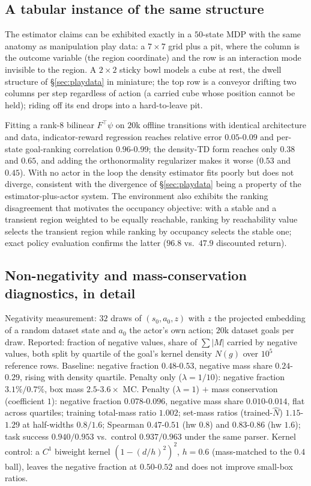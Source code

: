 \documentclass{article}
\newcommand{\Nhat}{\hat N}
\begin{document}
\subsection{A tabular instance of the same structure}
\label{app:playpen}

The estimator claims can be exhibited exactly in a $50$-state MDP with the same anatomy as manipulation play data: a $7\times7$ grid plus a pit, where the column is the outcome variable (the region coordinate) and the row is an interaction mode invisible to the region.
A $2\times2$ sticky bowl models a cube at rest, the dwell structure of \S\ref{sec:playdata} in miniature; the top row is a conveyor drifting two columns per step regardless of action (a carried cube whose position cannot be held); riding off its end drops into a hard-to-leave pit.

Fitting a rank-$8$ bilinear $F^{\top}\psi$ on $20$k offline transitions with identical architecture and data, indicator-reward regression reaches relative error $0.05$-$0.09$ and per-state goal-ranking correlation $0.96$-$0.99$; the density-TD form reaches only $0.38$ and $0.65$, and adding the orthonormality regularizer makes it worse ($0.53$ and $0.45$).
With no actor in the loop the density estimator fits poorly but does not diverge, consistent with the divergence of \S\ref{sec:playdata} being a property of the estimator-plus-actor system.
The environment also exhibits the ranking disagreement that motivates the occupancy objective: with a stable and a transient region weighted to be equally reachable, ranking by reachability value selects the transient region while ranking by occupancy selects the stable one; exact policy evaluation confirms the latter ($96.8$ vs.\ $47.9$ discounted return).

\subsection{Non-negativity and mass-conservation diagnostics, in detail}
\label{app:validity}

Negativity measurement: $32$ draws of $(s_0,a_0,z)$ with $z$ the projected embedding of a random dataset state and $a_0$ the actor's own action; $20$k dataset goals per draw.
Reported: fraction of negative values, share of $\sum|M|$ carried by negative values, both split by quartile of the goal's kernel density $N(g)$ over $10^5$ reference rows.
Baseline: negative fraction $0.48$-$0.53$, negative mass share $0.24$-$0.29$, rising with density quartile.
Penalty only ($\lambda{=}1/10$): negative fraction $3.1\%/0.7\%$, box mass $2.5$-$3.6\times$ MC.
Penalty ($\lambda{=}1$) $+$ mass conservation (coefficient $1$): negative fraction $0.078$-$0.096$, negative mass share $0.010$-$0.014$, flat across quartiles; training total-mass ratio $1.002$; set-mass ratios (trained-$\Nhat$) $1.15$-$1.29$ at half-widths $0.8/1.6$; Spearman $0.47$-$0.51$ (hw $0.8$) and $0.83$-$0.86$ (hw $1.6$); task success $0.940/0.953$ vs.\ control $0.937/0.963$ under the same parser.
Kernel control: a $C^1$ biweight kernel $(1-(d/h)^2)^2$, $h=0.6$ (mass-matched to the $0.4$ ball), leaves the negative fraction at $0.50$-$0.52$ and does not improve small-box ratios.
\end{document}

